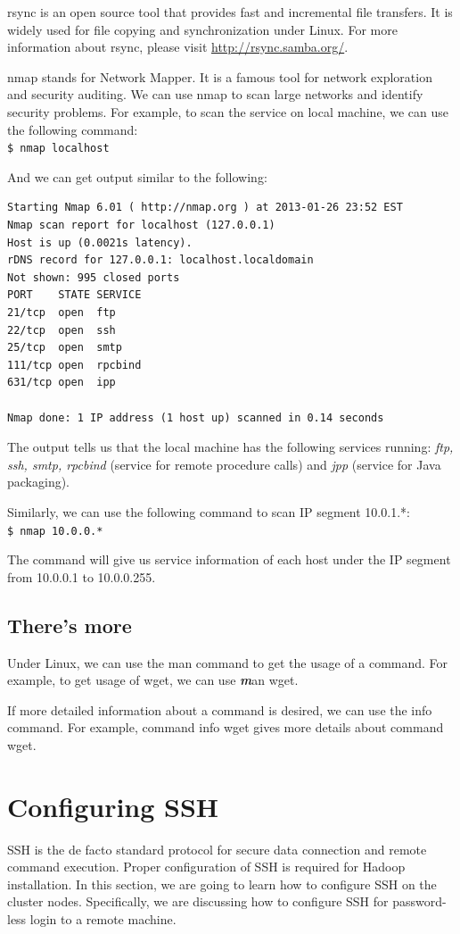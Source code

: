 rsync\emph{} is an open source tool that provides fast and incremental file transfers. It is widely used for file copying and synchronization under Linux. For more information about rsync, please visit \url{http://rsync.samba.org/}.

nmap\emph{} stands for Network Mapper. It is a famous tool for network exploration and security auditing. We can use nmap to scan large networks and identify security problems. For example, to scan the service on local machine, we can use the following command:\\
\verb|$ nmap localhost|

And we can get output similar to the following:
\lstset{style=bashstyle}
\begin{lstlisting}
Starting Nmap 6.01 ( http://nmap.org ) at 2013-01-26 23:52 EST
Nmap scan report for localhost (127.0.0.1)
Host is up (0.0021s latency).
rDNS record for 127.0.0.1: localhost.localdomain
Not shown: 995 closed ports
PORT    STATE SERVICE
21/tcp  open  ftp
22/tcp  open  ssh
25/tcp  open  smtp
111/tcp open  rpcbind
631/tcp open  ipp

Nmap done: 1 IP address (1 host up) scanned in 0.14 seconds
\end{lstlisting}

The output tells us that the local machine has the following services running: \emph{ftp, ssh, smtp, rpcbind} (service for remote procedure calls) and \emph{jpp} (service for Java packaging).

Similarly, we can use the following command to scan IP segment 10.0.1.*: \\
\verb|$ nmap 10.0.0.*|

The command will give us service information of each host under the IP segment from 10.0.0.1 to 10.0.0.255.

\subsection*{There's more}
Under Linux, we can use the man command to get the usage of a command. For example, to get usage of wget, we can use {\emph \textbf man wget}.

If more detailed information about a command is desired, we can use the info command. For example, command info wget gives more details about command wget.

\section{Configuring SSH}
SSH is the de facto standard protocol for secure data connection and remote command execution. Proper configuration of SSH is required for Hadoop installation. In this section, we are going to learn how to configure SSH on the cluster nodes. Specifically, we are discussing how to configure SSH for password-less login to a remote machine.

